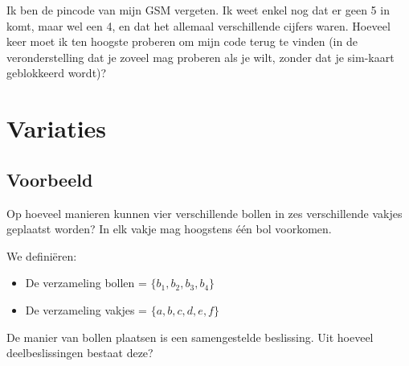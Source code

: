 \documentclass[12pt,twoside]{article}
\begin{document}
\begin{oefening}
Ik ben de pincode van mijn GSM vergeten. Ik weet enkel nog dat er geen 5 in komt, maar wel een 4, en dat het allemaal verschillende cijfers waren. Hoeveel keer moet ik ten hoogste proberen om mijn code terug te vinden (in de veronderstelling dat je zoveel mag proberen als je wilt, zonder dat je sim-kaart geblokkeerd wordt)?
\end{oefening}

% 
% 


\section{Variaties}

\subsection{Voorbeeld}

Op hoeveel manieren kunnen vier verschillende bollen in zes verschillende vakjes geplaatst worden? In elk vakje mag hoogstens één bol voorkomen.

We definiëren:
\begin{itemize}
  \item De verzameling bollen = $\{b_1, b_2, b_3, b_4\}$
  \item De verzameling vakjes = $\{a, b, c, d, e, f\}$
\end{itemize}

\begin{oefening}
De manier van bollen plaatsen is een samengestelde beslissing. Uit hoeveel deelbeslissingen bestaat deze?
\end{oefening}
\end{document}
